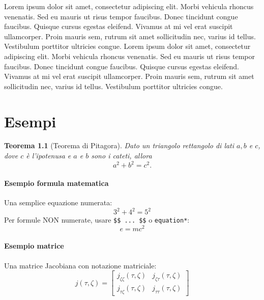 \documentclass[12pt, a4paper, oneside, openright]{book}
\theoremstyle{definition}
\numberwithin{definition}{chapter}
\theoremstyle{definition}
\numberwithin{assumption}{chapter}
\theoremstyle{remark}
\numberwithin{example}{chapter}
\theoremstyle{remark}
\numberwithin{remark}{chapter}
\theoremstyle{plain}
\newtheorem{theorem}{Teorema}
\numberwithin{theorem}{chapter}
\numberwithin{corollary}{chapter}
\numberwithin{lemma}{chapter}
\numberwithin{proposition}{chapter}
\begin{document}
Lorem ipsum dolor sit amet, consectetur adipiscing elit. Morbi vehicula rhoncus venenatis. Sed eu mauris ut risus tempor faucibus. Donec tincidunt congue faucibus. Quisque cursus egestas eleifend. Vivamus at mi vel erat suscipit ullamcorper. Proin mauris sem, rutrum sit amet sollicitudin nec, varius id tellus. Vestibulum porttitor ultricies congue. Lorem ipsum dolor sit amet, consectetur adipiscing elit. Morbi vehicula rhoncus venenatis. Sed eu mauris ut risus tempor faucibus. Donec tincidunt congue faucibus. Quisque cursus egestas eleifend. Vivamus at mi vel erat suscipit ullamcorper. Proin mauris sem, rutrum sit amet sollicitudin nec, varius id tellus. Vestibulum porttitor ultricies congue.


\chapter{Esempi}

\begin{theorem}[Teorema di Pitagora]
Dato un triangolo rettangolo di lati $a, b$ e $c$, dove $c$ è l'ipotenusa e $a$ e $b$ sono i cateti, allora
$$
    a^2 + b^2 = c^2.
$$
\end{theorem}

\subsubsection{Esempio formula matematica}

Una semplice equazione numerata:
\begin{equation}
    3^2 + 4^2 = 5^2
\end{equation}
Per formule NON numerate, usare \texttt{\$\$ ... \$\$} o \texttt{equation*}:
$$
    e = mc^2
$$

\subsubsection{Esempio matrice}

Una matrice Jacobiana con notazione matriciale:
\begin{equation}
    j(\tau,\zeta) = \begin{bmatrix}
        j_{\zeta \zeta}(\tau,\zeta) & j_{\zeta \tau}(\tau,\zeta) \\
        j_{\tau \zeta}(\tau,\zeta) & j_{\tau \tau}(\tau,\zeta)
    \end{bmatrix}
\end{equation}
\end{document}
